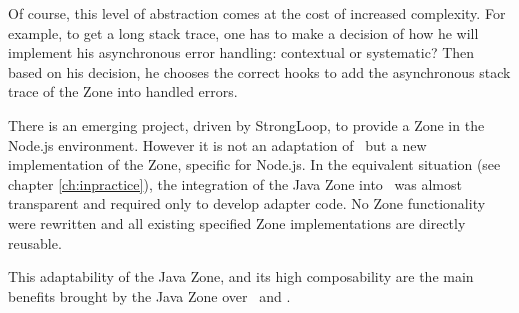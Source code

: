Of course, this level of abstraction comes at the cost of increased complexity. For example, to get a long stack trace, one has to make a decision of how he will implement his asynchronous error handling: contextual or systematic? Then based on his decision, he chooses the correct hooks to add the asynchronous stack trace of the Zone into handled errors.

There is an emerging project, driven by StrongLoop, to provide a Zone in the Node.js environment. However it is not an adaptation of \zonejs\ but a new implementation of the Zone, specific for Node.js. In the equivalent situation (see chapter \ref{ch:inpractice}), the integration of the Java Zone into \vertx\ was almost transparent and required only to develop adapter code. No Zone functionality were rewritten and all existing specified Zone implementations are directly reusable.

This adaptability of the Java Zone, and its high composability are the main benefits brought by the Java Zone over \zonejs\ and \zonedrt.
